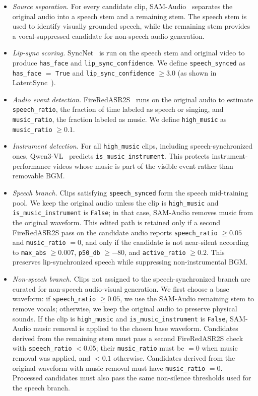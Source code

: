 \begin{itemize}
    \item \textit{Source separation.} For every candidate clip, SAM-Audio~\citep{shi2025samaudio} separates the original audio into a speech stem and a remaining stem. The speech stem is used to identify visually grounded speech, while the remaining stem provides a vocal-suppressed candidate for non-speech audio generation.
    \item \textit{Lip-sync scoring.} SyncNet~\citep{chung2016out} is run on the speech stem and original video to produce \texttt{has\_face} and \texttt{lip\_sync\_confidence}. We define \texttt{speech\_synced} as \texttt{has\_face} $=$ \texttt{True} and \texttt{lip\_sync\_confidence} $\geq 3.0$ (as shown in LatentSync~\citep{li2024latentsync}).
    \item \textit{Audio event detection.} FireRedASR2S~\citep{xu2026fireredasr2s} runs on the original audio to estimate \texttt{speech\_ratio}, the fraction of time labeled as speech or singing, and \texttt{music\_ratio}, the fraction labeled as music. We define \texttt{high\_music} as \texttt{music\_ratio} $\geq 0.1$.
    \item \textit{Instrument detection.} For all \texttt{high\_music} clips, including speech-synchronized ones, Qwen3-VL~\citep{qwen3vl2025} predicts \texttt{is\_music\_instrument}. This protects instrument-performance videos whose music is part of the visible event rather than removable BGM.
    \item \textit{Speech branch.} Clips satisfying \texttt{speech\_synced} form the speech mid-training pool. We keep the original audio unless the clip is \texttt{high\_music} and \texttt{is\_music\_instrument} is \texttt{False}; in that case, SAM-Audio removes music from the original waveform. This edited path is retained only if a second FireRedASR2S pass on the candidate audio reports \texttt{speech\_ratio} $\geq 0.05$ and \texttt{music\_ratio} $= 0$, and only if the candidate is not near-silent according to \texttt{max\_abs} $\geq 0.007$, \texttt{p50\_db} $\geq -80$, and \texttt{active\_ratio} $\geq 0.2$. This preserves lip-synchronized speech while suppressing non-instrumental BGM.
    \item \textit{Non-speech branch.} Clips not assigned to the speech-synchronized branch are curated for non-speech audio-visual generation. We first choose a base waveform: if \texttt{speech\_ratio} $\geq 0.05$, we use the SAM-Audio remaining stem to remove vocals; otherwise, we keep the original audio to preserve physical sounds. If the clip is \texttt{high\_music} and \texttt{is\_music\_instrument} is \texttt{False}, SAM-Audio music removal is applied to the chosen base waveform. Candidates derived from the remaining stem must pass a second FireRedASR2S check with \texttt{speech\_ratio} $< 0.05$; their \texttt{music\_ratio} must be $= 0$ when music removal was applied, and $< 0.1$ otherwise. Candidates derived from the original waveform with music removal must have \texttt{music\_ratio} $= 0$. Processed candidates must also pass the same non-silence thresholds used for the speech branch.

\end{itemize}
